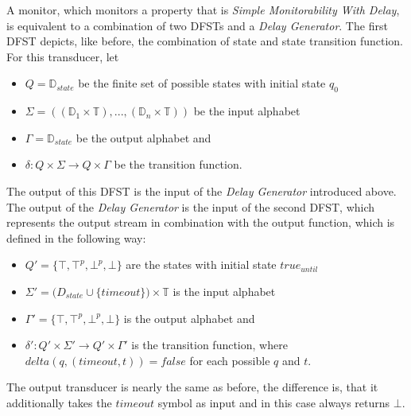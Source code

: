 	
		A monitor, which monitors a property that is \textit{Simple Monitorability With Delay}, is equivalent to a combination of two DFSTs and a \textit{Delay Generator}. The first DFST depicts, like before, the combination of state and state transition function. For this transducer, let
		\begin{itemize}
			\item
			$Q=\mathbb{D}_{state}$ be the finite set of possible states with initial state $q_0$
			\item
			$\Sigma=((\mathbb{D}_1\times \mathbb{T}),...,(\mathbb{D}_n\times \mathbb{T}))$ be the input alphabet
			\item
			$\Gamma = \mathbb D_{state}$ be the output alphabet and
			\item
			$\delta: Q\times \Sigma\rightarrow Q\times\Gamma$ be the transition function.
		\end{itemize}
		The output of this DFST is the input of the \textit{Delay Generator} introduced above. The output of the \textit{Delay Generator} is the input of the second DFST, which represents the output stream in combination with the output function, which is defined in the following way:
		\begin{itemize}
			\item
			$Q' = \{\top, \top^p, \bot^p, \bot\}$ are the states with initial state $true_{until}$
			\item
			$\Sigma'=\mathbb (D_{state}\cup\{timeout\})\times \mathbb{T}$ is the input alphabet
			\item
			$\Gamma' = \{\top, \top^p, \bot^p, \bot\}$ is the output alphabet and
			\item
			$\delta': Q'\times \Sigma'\rightarrow Q'\times\Gamma'$ is the transition function, where $delta(q, (timeout, t))=false$ for each possible $q$ and $t$.
		\end{itemize}
		The output transducer is nearly the same as before, the difference is, that it additionally takes the $timeout$ symbol as input and in this case always returns $\bot$.


